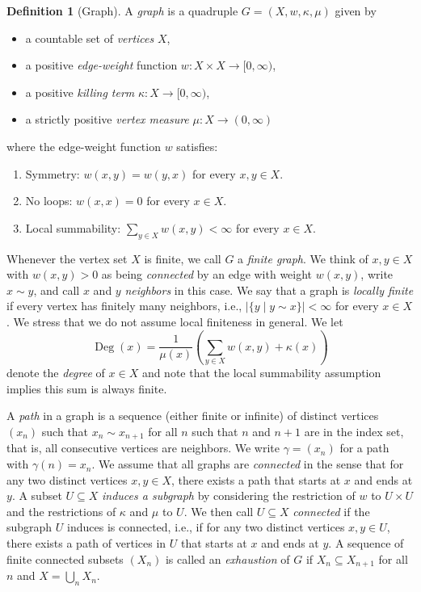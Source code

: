 \documentclass[letterpaper]{article}
\theoremstyle{definition}
\newtheorem{definition}[lemma]{Definition}
\theoremstyle{named}
\numberwithin{equation}{section}
\newcommand{\Deg}{\operatorname{Deg}}
\begin{document}
\begin{definition}[Graph]
	A \textit{graph} is a quadruple $G=(X,w,\kappa,\mu)$ given by
	\begin{itemize}
		\item  a countable set of \emph{vertices} $X$,
		\item a positive \emph{edge-weight} function $w\colon X\times X \to [0,\infty)$,
		\item  a positive \emph{killing term} $\kappa \colon X \to [0,\infty)$,
		\item a strictly positive \emph{vertex measure} $\mu \colon X \to (0,\infty)$
	\end{itemize}
	where the edge-weight function $w$ satisfies:
	\begin{enumerate}
		\item[(1)]\label{assumption:symmetry} Symmetry: $w(x,y)=w(y,x)$ for every $x,y \in X$.
		\item[(2)]\label{assumption:loops} No loops: $w(x,x)=0$ for every $x \in X$.
		\item[(3)]\label{assumption:degree} Local summability: $\sum_{y\in X} w(x,y) < \infty$ for every $x \in X$.
	\end{enumerate}
\end{definition}
Whenever the vertex set $X$ is finite, we call $G$ a \emph{finite graph}.
We think of $x, y \in X$ with $w(x,y)>0$ as being \emph{connected}
by an edge with weight $w(x,y)$, write $x \sim y$, and call $x$ and $y$ 
\emph{neighbors} in this case.
We say that a graph is \emph{locally finite} if every vertex
has finitely many neighbors, i.e.,
$| \{ y \mid y \sim x \}| < \infty$
for every $x \in X$. We stress that we do not assume local finiteness in general. 
We let 
$$\Deg(x)= \frac{1}{\mu(x)}\left( \sum_{y \in X}w(x,y) + \kappa(x)\right)$$
denote the \emph{degree} of $x \in X$ and note that the local summability assumption implies this sum is always finite.

A \emph{path} in a graph is a sequence (either finite or infinite) of distinct vertices $(x_n)$ such that
$x_n \sim x_{n+1}$ for all $n$ such that $n$ and $n+1$ are in the index set, that is, all consecutive vertices
are neighbors. 
We write $\gamma=(x_n)$ for a path with $\gamma(n)=x_n$.
We assume that all graphs are \emph{connected}
in the sense that for any two distinct vertices $x, y \in X$, there exists a path
that starts at $x$ and ends at $y$.
A subset $U \subseteq X$ \emph{induces a subgraph} by considering the restriction of 
$w$ to $U \times U$ and the restrictions of $\kappa$ and $\mu$ to $U$.
We then call $U \subseteq X$ \emph{connected} if the subgraph
$U$ induces is connected, i.e.,
if for any two distinct vertices $x, y \in U$,
there exists a path of vertices in $U$ that starts at $x$ and ends at $y$.
A sequence of finite connected subsets $(X_n)$ is called an \emph{exhaustion} of $G$
if $X_n \subseteq X_{n+1}$ for all $n$ and $X=\bigcup_n X_n$.
\end{document}
